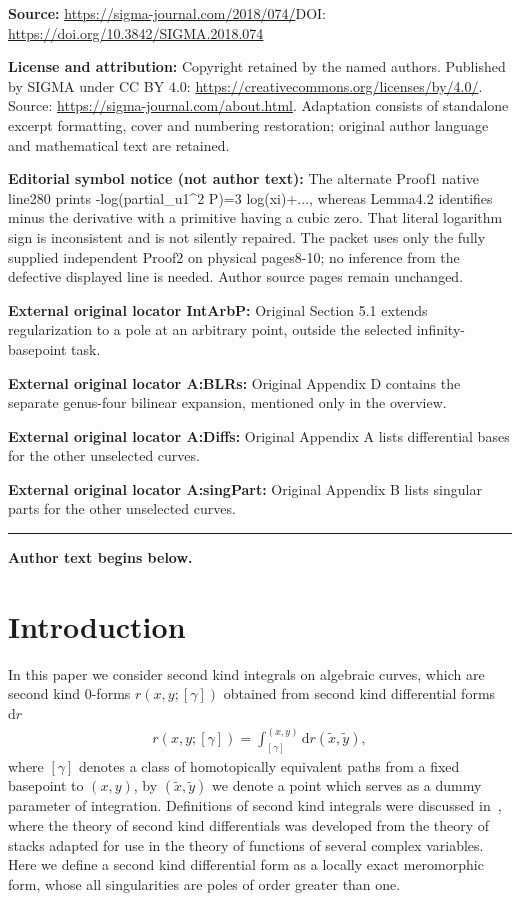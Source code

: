 \documentclass[11pt]{article}
\numberwithin{equation}{section}
\newcommand{\rmd}{\mathrm{d}}
\begin{document}
\noindent\textbf{Source:} \url{https://sigma-journal.com/2018/074/}\quad DOI: \url{https://doi.org/10.3842/SIGMA.2018.074}\par
\noindent\textbf{License and attribution:} Copyright retained by the named authors. Published by SIGMA under CC BY 4.0: \url{https://creativecommons.org/licenses/by/4.0/}. Source: \url{https://sigma-journal.com/about.html}. Adaptation consists of standalone excerpt formatting, cover and numbering restoration; original author language and mathematical text are retained.\par
\noindent\textbf{Editorial symbol notice (not author text):} The alternate Proof1 native line280 prints -log(partial\_u1\textasciicircum{}2 P)=\allowbreak{}3 log(xi)+\allowbreak{}..., whereas Lemma4.2 identifies minus the derivative with a primitive having a cubic zero. That literal logarithm sign is inconsistent and is not silently repaired. The packet uses only the fully supplied independent Proof2 on physical pages8-10; no inference from the defective displayed line is needed. Author source pages remain unchanged.\par
\noindent\textbf{External original locator IntArbP:} Original Section 5.1 extends regularization to a pole at an arbitrary point, outside the selected infinity-basepoint task.\par
\noindent\textbf{External original locator A:BLRs:} Original Appendix D contains the separate genus-four bilinear expansion, mentioned only in the overview.\par
\noindent\textbf{External original locator A:Diffs:} Original Appendix A lists differential bases for the other unselected curves.\par
\noindent\textbf{External original locator A:singPart:} Original Appendix B lists singular parts for the other unselected curves.\par
\medskip\hrule\medskip\noindent\textbf{Author text begins below.}\par
\setcounter{section}{0}
\setcounter{subsection}{0}
\setcounter{subsubsection}{0}
\setcounter{Theorem}{0}
\setcounter{equation}{0}
\section{Introduction}

In this paper we consider second kind integrals on algebraic curves, which are second kind $0$-forms $r(x,y;[\gamma])$ obtained from second kind differential forms $\rmd r$
\begin{gather}\label{SecKIntA}
 r(x,y;[\gamma]) = \int_{[\gamma]}^{(x,y)} \rmd r(\tilde{x},\tilde{y}),
\end{gather}
where $[\gamma]$ denotes a class of homotopically equivalent paths {from a fixed basepoint to $(x,y)$, by $(\tilde{x},\tilde{y})$ we denote a point which serves as a dummy parameter of integration}. Definitions of second kind integrals were discussed in~\cite{Hodge}, where the theory of second kind differentials was developed from the theory of stacks adapted for use in the theory of functions of several complex variables. Here we define a second kind differential form as a locally exact meromorphic form, whose all singularities are poles of order greater than one.
\end{document}
